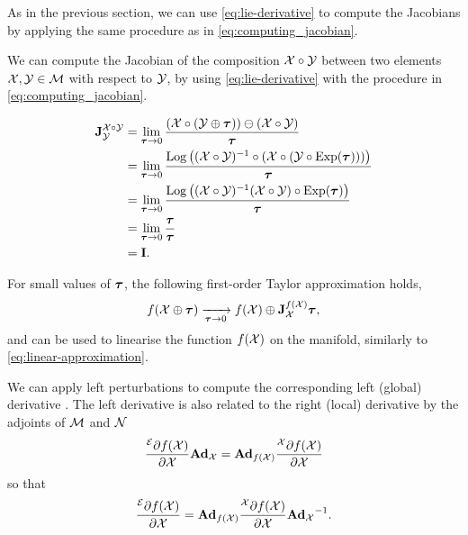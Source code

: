 As in the previous section, we can use \eqref{eq:lie-derivative} to compute the Jacobians by applying the same procedure as in \eqref{eq:computing_jacobian}.

\begin{example}[frametitle=Computing the Jacobian $\jac{\cX \circ \cY}{\cY}$ on the manifold]
We can compute the Jacobian of the composition $\mathcal{X} \circ \mathcal{Y}$ between two elements $\mathcal{X}, \mathcal{Y} \in \mathcal{M}$ with respect to $\mathcal{Y}$, by using \eqref{eq:lie-derivative} with the procedure in \eqref{eq:computing_jacobian}.

\begin{subequations}
\begin{align}
  {{\boldsymbol{\mathbf{J}}}^{\mathcal{X}\circ \mathcal{Y}}_{\mathcal{Y}}} &= \lim_{{\boldsymbol{\mathbf{\tau}}} \to 0} 
  \frac{(\mathcal{X} \circ (\mathcal{Y} \oplus {\boldsymbol{\mathbf{\tau}}})) \ominus (\mathcal{X} \circ \mathcal{Y})}{{\boldsymbol{\mathbf{\tau}}}}\\
  &= \lim_{{\boldsymbol{\mathbf{\tau}}} \to 0} 
  \frac{\operatorname*{Log} \left( (\mathcal{X} \circ \mathcal{Y})^{-1} \circ (\mathcal{X} \circ (\mathcal{Y} \circ \operatorname*{Exp}({\boldsymbol{\mathbf{\tau}}}))) \right)}{{\boldsymbol{\mathbf{\tau}}}}\\
  &= \lim_{{\boldsymbol{\mathbf{\tau}}} \to 0} 
  \frac{\operatorname*{Log} \left( (\mathcal{X} \circ \mathcal{Y})^{-1} (\mathcal{X} \circ \mathcal{Y}) \circ \operatorname*{Exp}({\boldsymbol{\mathbf{\tau}}}) \right)}{{\boldsymbol{\mathbf{\tau}}}}\\
  &= \lim_{{\boldsymbol{\mathbf{\tau}}} \to 0} 
  \frac{{\boldsymbol{\mathbf{\tau}}}}{{\boldsymbol{\mathbf{\tau}}}}\\
  &= {\boldsymbol{\mathbf{I}}}.
\end{align}
\end{subequations}
\end{example}

For small values of ${\boldsymbol{\mathbf{\tau}}}$, the following first-order Taylor approximation holds,
\begin{equation} \label{eq:lie-linearisation}
  f(\mathcal{X} \oplus {\boldsymbol{\mathbf{\tau}}}) \xrightarrow[{\boldsymbol{\mathbf{\tau}}} \to 0]{}
  f(\mathcal{X}) \oplus {{\boldsymbol{\mathbf{J}}}^{f(\mathcal{X})}_{\mathcal{X}}} {\boldsymbol{\mathbf{\tau}}},
\end{equation}
and can be used to linearise the function $f(\mathcal{X})$ on the manifold, similarly to \eqref{eq:linear-approximation}.

We can apply left perturbations to compute the corresponding left (global) derivative \cite{SolaARobotics}.
The left derivative is also related to the right (local) derivative by the adjoints of $\mathcal{M}$ and $\mathcal{N}$
\begin{equation}
  \frac{^{\mathcal{E}} \partial f(\mathcal{X})}{\partial \mathcal{X}} \boldsymbol{\mathbf{Ad}}_{\mathcal{X}} = \boldsymbol{\mathbf{Ad}}_{f(\mathcal{X})} \frac{^{\mathcal{X}} \partial f(\mathcal{X})}{\partial \mathcal{X}}
\end{equation}
so that
\begin{equation}
  \frac{^{\mathcal{E}} \partial f(\mathcal{X})}{\partial \mathcal{X}} = \boldsymbol{\mathbf{Ad}}_{f(\mathcal{X})} \frac{^{\mathcal{X}} \partial f(\mathcal{X})}{\partial \mathcal{X}} {\boldsymbol{\mathbf{Ad}}_{\mathcal{X}}}^{-1}.
\end{equation}

